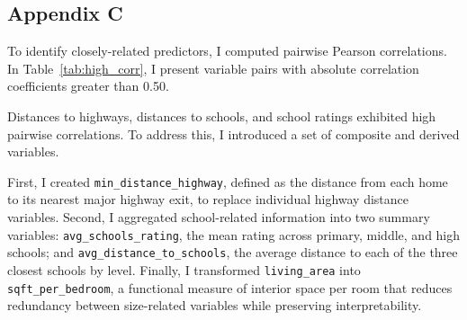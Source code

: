 \subsection*{Appendix C}

To identify closely-related predictors, I computed pairwise Pearson correlations. In Table~\ref{tab:high_corr}, I present variable pairs with absolute correlation coefficients greater than 0.50.



Distances to highways, distances to schools, and school ratings exhibited high pairwise correlations. To address this, I introduced a set of composite and derived variables. 

First, I created \texttt{min\_distance\_highway}, defined as the distance from each home to its nearest major highway exit, to replace individual highway distance variables. Second, I aggregated school-related information into two summary variables: \texttt{avg\_schools\_rating}, the mean rating across primary, middle, and high schools; and \texttt{avg\_distance\_to\_schools}, the average distance to each of the three closest schools by level. Finally, I transformed \texttt{living\_area} into \texttt{sqft\_per\_bedroom}, a functional measure of interior space per room that reduces redundancy between size-related variables while preserving interpretability.


